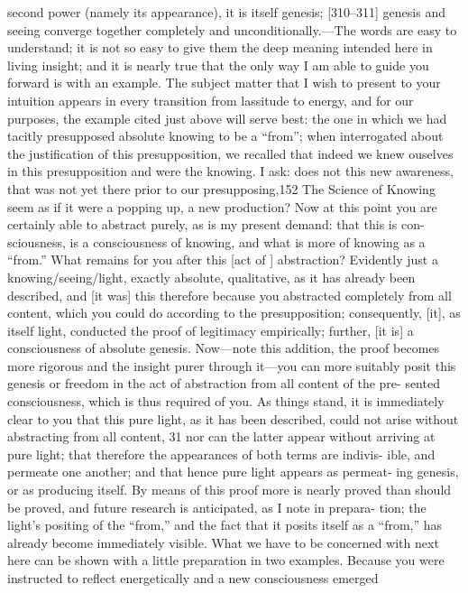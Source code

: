 second power (namely its appearance), it is itself genesis; [310–311] genesis
and seeing converge together completely and unconditionally.—The words
are easy to understand; it is not so easy to give them the deep meaning
intended here in living insight; and it is nearly true that the only way I am able
to guide you forward is with an example. The subject matter that I wish to
present to your intuition appears in every transition from lassitude to energy,
and for our purposes, the example cited just above will serve best: the one in
which we had tacitly presupposed absolute knowing to be a “from”; when
interrogated about the justification of this presupposition, we recalled that
indeed we knew ouselves in this presupposition and were the knowing. I ask:
does not this new awareness, that was not yet there prior to our presupposing,152
The Science of Knowing
seem as if it were a popping up, a new production? Now at this point you are
certainly able to abstract purely, as is my present demand: that this is con-
sciousness, is a consciousness of knowing, and what is more of knowing as a
“from.” What remains for you after this [act of ] abstraction? Evidently just a
knowing/seeing/light, exactly absolute, qualitative, as it has already been
described, and [it was] this therefore because you abstracted completely from
all content, which you could do according to the presupposition; consequently,
[it], as itself light, conducted the proof of legitimacy empirically; further, [it is]
a consciousness of absolute genesis. Now—note this addition, the proof becomes
more rigorous and the insight purer through it—you can more suitably posit
this genesis or freedom in the act of abstraction from all content of the pre-
sented consciousness, which is thus required of you. As things stand, it is
immediately clear to you that this pure light, as it has been described, could not
arise without abstracting from all content, 31 nor can the latter appear without
arriving at pure light; that therefore the appearances of both terms are indivis-
ible, and permeate one another; and that hence pure light appears as permeat-
ing genesis, or as producing itself. By means of this proof more is nearly proved
than should be proved, and future research is anticipated, as I note in prepara-
tion; the light’s positing of the “from,” and the fact that it posits itself as a
“from,” has already become immediately visible. What we have to be concerned
with next here can be shown with a little preparation in two examples. Because
you were instructed to reflect energetically and a new consciousness emerged
